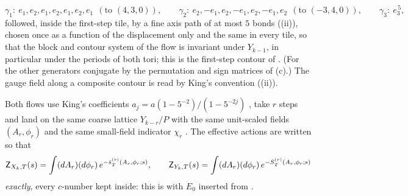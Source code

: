 \begin{definition}
\begin{itemize}[leftmargin=*]
\[
\gamma_1:\ e_1,e_2,e_1,e_2,e_1,e_2,e_1\ \ (\text{to }(4,3,0)),\qquad
\gamma_2:\ e_2,-e_1,e_2,-e_1,e_2,-e_1,e_2\ \ (\text{to }(-3,4,0)),\qquad
\gamma_3:\ e_3^{\,5},
\]
followed, inside the first-step tile, by a fine axis path of at most $5$ bonds ((ii)), chosen once as a function of the displacement only and the same in every tile, so that the block and contour system of the flow is invariant under $Y_{k-1}$, in particular under the periods of both tori; this is the first-step contour of \cite[(4.4)]{K2}. (For the other generators conjugate by the permutation and sign matrices of (c).) The gauge field along a composite contour is read by King's convention \cite[(2.19)]{K1} ((ii)).
\end{itemize}
Both flows use King's coefficients $a_j=a(1-5^{-2})/(1-5^{-2j})$ \cite[p.~653]{K1}, take $r$ steps and land on the same coarse lattice $Y_{k-r}/P$ with the same unit-scaled fields $(A_r,\phi_r)$ and the same small-field indicator $\chi_r$ \cite[(3.2)]{K1}. The effective actions are written so that
\[
\mathsf Z_{X_k,T}(s)=\int(dA_r)(d\phi_r)\,e^{-\hat s^{(r)}_T(A_r,\phi_r;s)},\qquad
\mathsf Z_{Y_k,T}(s)=\int(dA_r)(d\phi_r)\,e^{-S^{(r)}_T(A_r,\phi_r;s)}
\]
\emph{exactly}, every $c$-number kept inside: this is \cite[(3.14), (3.90)]{K1} with $E_0$ inserted from \cite[(3.89)]{K1}.
\end{definition}

